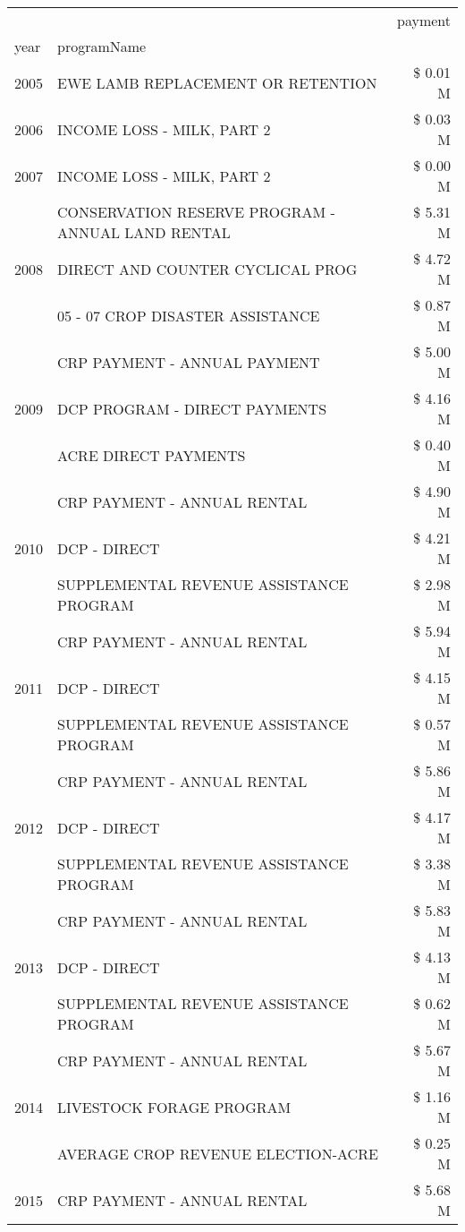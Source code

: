 \begin{tabular}{llr}
\toprule
 &  & payment \\
year & programName &  \\
\midrule
2005 & EWE LAMB REPLACEMENT OR RETENTION & \$ 0.01 M \\
\cline{1-3}
2006 & INCOME LOSS - MILK, PART 2 & \$ 0.03 M \\
\cline{1-3}
2007 & INCOME LOSS - MILK, PART 2 & \$ 0.00 M \\
\cline{1-3}
\multirow[t]{3}{*}{2008} & CONSERVATION RESERVE PROGRAM - ANNUAL LAND RENTAL & \$ 5.31 M \\
 & DIRECT AND COUNTER CYCLICAL PROG & \$ 4.72 M \\
 & 05 - 07 CROP DISASTER ASSISTANCE & \$ 0.87 M \\
\cline{1-3}
\multirow[t]{3}{*}{2009} & CRP PAYMENT - ANNUAL PAYMENT & \$ 5.00 M \\
 & DCP PROGRAM - DIRECT PAYMENTS & \$ 4.16 M \\
 & ACRE DIRECT PAYMENTS & \$ 0.40 M \\
\cline{1-3}
\multirow[t]{3}{*}{2010} & CRP PAYMENT - ANNUAL RENTAL & \$ 4.90 M \\
 & DCP - DIRECT & \$ 4.21 M \\
 & SUPPLEMENTAL REVENUE ASSISTANCE PROGRAM & \$ 2.98 M \\
\cline{1-3}
\multirow[t]{3}{*}{2011} & CRP PAYMENT - ANNUAL RENTAL & \$ 5.94 M \\
 & DCP - DIRECT & \$ 4.15 M \\
 & SUPPLEMENTAL REVENUE ASSISTANCE PROGRAM & \$ 0.57 M \\
\cline{1-3}
\multirow[t]{3}{*}{2012} & CRP PAYMENT - ANNUAL RENTAL & \$ 5.86 M \\
 & DCP - DIRECT & \$ 4.17 M \\
 & SUPPLEMENTAL REVENUE ASSISTANCE PROGRAM & \$ 3.38 M \\
\cline{1-3}
\multirow[t]{3}{*}{2013} & CRP PAYMENT - ANNUAL RENTAL & \$ 5.83 M \\
 & DCP - DIRECT & \$ 4.13 M \\
 & SUPPLEMENTAL REVENUE ASSISTANCE PROGRAM & \$ 0.62 M \\
\cline{1-3}
\multirow[t]{3}{*}{2014} & CRP PAYMENT - ANNUAL RENTAL & \$ 5.67 M \\
 & LIVESTOCK FORAGE PROGRAM & \$ 1.16 M \\
 & AVERAGE CROP REVENUE ELECTION-ACRE & \$ 0.25 M \\
\cline{1-3}
\multirow[t]{3}{*}{2015} & CRP PAYMENT - ANNUAL RENTAL & \$ 5.68 M \\

\end{tabular}
